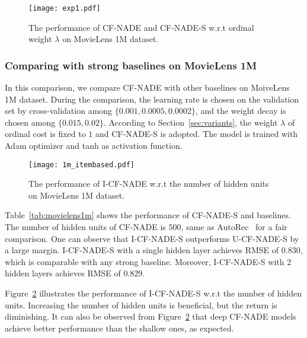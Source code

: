 \documentclass{article}
\newcommand{\cfnade}{CF-NADE\xspace}
\begin{document}
 \begin{figure}[h]
 \begin{center}
 \centerline{\texttt{[image: exp1.pdf]}}
 \caption{The performance of \cfnade and {\cfnade}-S w.r.t ordinal weight $\lambda$ on MovieLens 1M dataset.}
 \label{fig:exp1}
 \end{center}
 \end{figure}
 
 \subsubsection{Comparing with strong baselines on MovieLens 1M}
 \label{sec:1mbaselines}
 


 In this comparison, we compare \cfnade with other baselines on MoiveLens 1M dataset. During the comparison, the learning rate is chosen on the validation set by
 cross-validation among $\{0.001,0.0005,0.0002\}$, and the weight decay is
 chosen among $\{0.015,0.02\}$.  According to
 Section~\ref{sec:variants}, the weight $\lambda$ of ordinal cost is
 fixed to $1$ and {\cfnade}-S is adopted. The model is trained with
 Adam optimizer and tanh as activation function.
 
 \begin{figure}[h]
 \begin{center}
 \centerline{\texttt{[image: 1m\_itembased.pdf]}}
 \caption{The performance of I-\cfnade w.r.t the number of hidden units on MovieLens 1M dataset.}
 \label{fig:exp2_a}
 \end{center}
 \end{figure}
 
 Table~\ref{tab:movielens1m} shows the performance of {\cfnade}-S and
 baselines. The number of hidden units of \cfnade is $500$, same as
 AutoRec~\citep{sedhain2015autorec} for a fair comparison. One can
 observe that I-{\cfnade}-S outperforms U-{\cfnade}-S by a
 large margin. I-{\cfnade}-S with a single hidden
 layer achieves RMSE of $0.830$, which is comparable with any strong
 baseline. Moreover, I-{\cfnade}-S with 2 hidden layers achieves RMSE of $0.829$.

 Figure~\ref{fig:exp2_a} illustrates the performance of I-{\cfnade}-S
 w.r.t the number of hidden units. Increasing the number of hidden
 units is beneficial, but the return is
 diminishing. It can also be observed from Figure~\ref{fig:exp2_a} that deep \cfnade models
 achieve better performance than the shallow ones, as expected.
\end{document}
